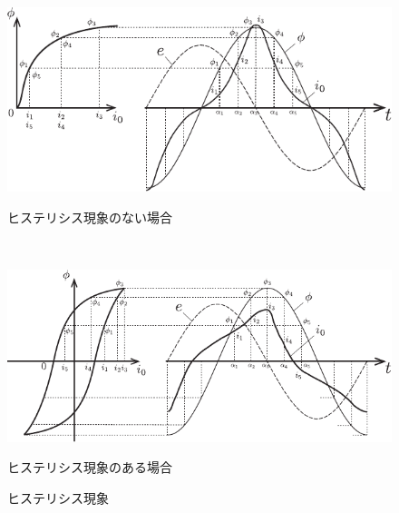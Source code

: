 \begin{figure}[h]
  \begin{minipage}[c]{0.5\hsize}
    \centering
    \includegraphics[scale=1.2]{fig/hizumi_a.pdf} 
    \caption{ヒステリシス現象のない場合}
  \end{minipage}\\
  \begin{minipage}[c]{0.5\hsize}
    \centering
    \includegraphics[scale=1.2]{fig/hizumi_b.pdf}
    \caption{ヒステリシス現象のある場合}
  \end{minipage}
  \centering
  \caption{ヒステリシス現象}
   \label{fig:hys:hizumi}
\end{figure}
